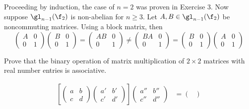 \begin{problems}
\begin{sol}
        Proceeding by induction, the case of $n = 2$ was proven in Exercise 3. Now suppose $\gl_{n - 1}(\f_2)$ is non-abelian for $n \geq 3$. Let $A, B \in \gl_{n - 1}(\f_2)$ be noncommuting matrices. Using a block matrix, then
        $$
        \begin{pmatrix}
            A & 0 \\
            0 & 1
        \end{pmatrix}
        \begin{pmatrix}
            B & 0 \\
            0 & 1
        \end{pmatrix} =
        \begin{pmatrix}
            AB & 0 \\
            0 & 1
        \end{pmatrix} \neq 
        \begin{pmatrix}
            BA & 0 \\
            0 & 1
        \end{pmatrix} = 
        \begin{pmatrix}
            B & 0 \\
            0 & 1
        \end{pmatrix}
        \begin{pmatrix}
            A & 0 \\
            0 & 1
        \end{pmatrix}$$
    \end{sol}
    \item Prove that the binary operation of matrix multiplication of $2 \times 2$ matrices with real number entries is associative.
    \begin{sol}
        \begin{align*}
            \left[
            \begin{pmatrix}
                a & b \\
                c & d
            \end{pmatrix}
            \begin{pmatrix}
                a' & b' \\
                c' & d'
            \end{pmatrix}
            \right]
            \begin{pmatrix}
                a'' & b'' \\
                c'' & d''
            \end{pmatrix} & = 
            \begin{pmatrix}

\end{pmatrix}
\end{align*}
\end{sol}
\end{problems}
